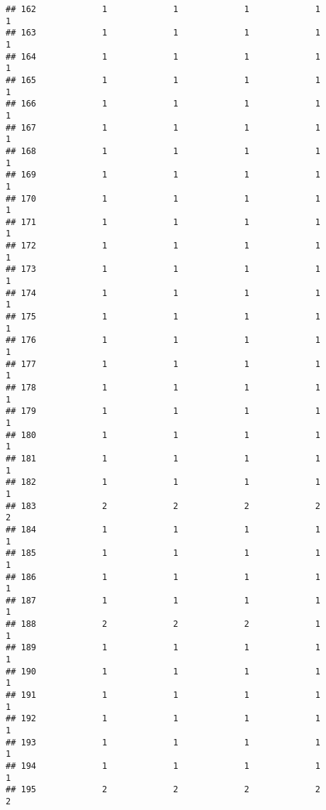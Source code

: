\documentclass[
]{article}
\begin{document}
\begin{verbatim}
## 162             1             1             1             1             1
## 163             1             1             1             1             1
## 164             1             1             1             1             1
## 165             1             1             1             1             1
## 166             1             1             1             1             1
## 167             1             1             1             1             1
## 168             1             1             1             1             1
## 169             1             1             1             1             1
## 170             1             1             1             1             1
## 171             1             1             1             1             1
## 172             1             1             1             1             1
## 173             1             1             1             1             1
## 174             1             1             1             1             1
## 175             1             1             1             1             1
## 176             1             1             1             1             1
## 177             1             1             1             1             1
## 178             1             1             1             1             1
## 179             1             1             1             1             1
## 180             1             1             1             1             1
## 181             1             1             1             1             1
## 182             1             1             1             1             1
## 183             2             2             2             2             2
## 184             1             1             1             1             1
## 185             1             1             1             1             1
## 186             1             1             1             1             1
## 187             1             1             1             1             1
## 188             2             2             2             1             1
## 189             1             1             1             1             1
## 190             1             1             1             1             1
## 191             1             1             1             1             1
## 192             1             1             1             1             1
## 193             1             1             1             1             1
## 194             1             1             1             1             1
## 195             2             2             2             2             2

\end{verbatim}
\end{document}
